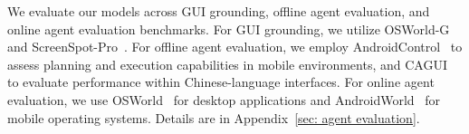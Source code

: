 \documentclass{article}
\theoremstyle{plain}
\theoremstyle{definition}
\theoremstyle{remark}
\begin{document}
We evaluate our models across GUI grounding, offline agent evaluation, and online agent evaluation benchmarks. For GUI grounding, we utilize OSWorld-G~\citep{xie2025scaling} and ScreenSpot-Pro~\citep{li2025screenspot}. For offline agent evaluation, we employ AndroidControl~\citep{li2024effects} to assess planning and execution capabilities in mobile environments, and CAGUI~\citep{zhang2025agentcpm} to evaluate performance within Chinese-language interfaces. For online agent evaluation, we use OSWorld~\citep{xie2024osworld} for desktop applications and AndroidWorld~\citep{rawles2024androidworld} for mobile operating systems. Details are in Appendix~\ref{sec: agent evaluation}.
\end{document}
